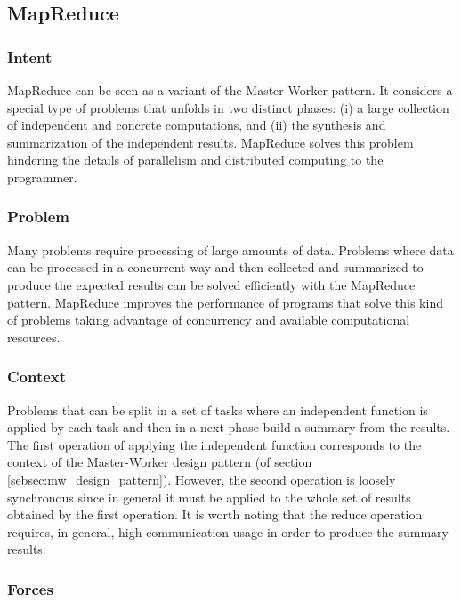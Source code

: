 \subsection{MapReduce}

\subsubsection{Intent}

MapReduce can be seen as a variant of the Master-Worker pattern. It considers a special type of problems that unfolds in two distinct phases: (i) a large collection of independent and concrete computations, and (ii) the synthesis and summarization of the independent results. MapReduce solves this problem hindering the details of parallelism and distributed computing to the programmer.

\subsubsection{Problem}

Many problems require processing of large amounts of data. Problems where data can be processed in a concurrent way and then collected and summarized to produce the expected results can be solved efficiently with the MapReduce pattern. MapReduce improves the performance of programs that solve this kind of problems taking advantage of concurrency and available computational resources.

\subsubsection{Context}

Problems that can be split in a set of tasks where an independent function is applied by each task and then in a next phase build a summary from the results. The first operation of applying the independent function corresponds to the context of the Master-Worker design pattern (of section \ref{sebsec:mw_design_pattern}). However, the second operation is loosely synchronous since in general it must be applied to the whole set of results obtained by the first operation. It is worth noting that the reduce operation requires, in general, high communication usage in order to produce the summary results.

\subsubsection{Forces}

